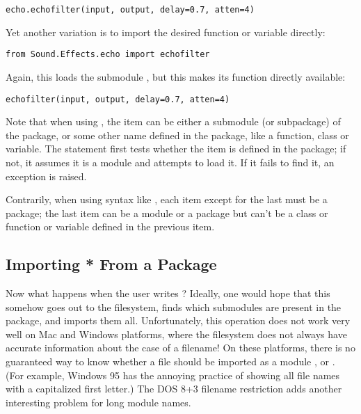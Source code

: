 \documentclass{manual}
\begin{document}
\begin{verbatim}
echo.echofilter(input, output, delay=0.7, atten=4)
\end{verbatim}

Yet another variation is to import the desired function or variable directly:

\begin{verbatim}
from Sound.Effects.echo import echofilter
\end{verbatim}

Again, this loads the submodule , but this makes its function
 directly available:

\begin{verbatim}
echofilter(input, output, delay=0.7, atten=4)
\end{verbatim}

Note that when using , the
item can be either a submodule (or subpackage) of the package, or some 
other name defined in the package, like a function, class or
variable.  The  statement first tests whether the item is
defined in the package; if not, it assumes it is a module and attempts
to load it.  If it fails to find it, an
 exception is raised.

Contrarily, when using syntax like , each item except for the last must be
a package; the last item can be a module or a package but can't be a
class or function or variable defined in the previous item.

\subsection{Importing * From a Package \label{pkg-import-star}}

Now what happens when the user writes ?  Ideally, one would hope that this somehow goes out to the
filesystem, finds which submodules are present in the package, and
imports them all.  Unfortunately, this operation does not work very
well on Mac and Windows platforms, where the filesystem does not
always have accurate information about the case of a filename!  On
these platforms, there is no guaranteed way to know whether a file
 should be imported as a module ,
 or .  (For example, Windows 95 has the
annoying practice of showing all file names with a capitalized first
letter.)  The DOS 8+3 filename restriction adds another interesting
problem for long module names.
\end{document}
